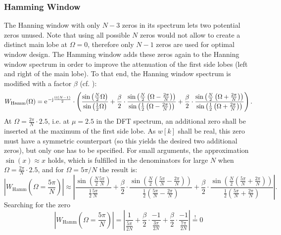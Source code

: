 \documentclass[11pt,a4paper,DIV=12]{scrartcl}
\begin{document}
\subsubsection{Hamming Window}
The Hanning window with only $N-3$ zeros in its spectrum lets two potential
zeros unused.
%
Note that using all possible $N$ zeros would not allow to create a distinct main
lobe at $\Omega=0$, therefore only $N-1$ zeros are used for optimal window
design.
%
The Hamming window adds these zeros again to the Hanning window spectrum in
order to improve the attenuation of the first side lobes (left and right of
the main lobe).
%
To that end, the Hanning window spectrum is modified with a factor $\beta$ (cf.
\cite[Ch. 3.10]{Rabiner1975}):
%
\begin{equation}
W_{\text{Hamm}}(\Omega)=\e^{-\im\frac{\Omega(N-1)}{2}}\cdot\left(\frac{\sin\left(\frac{N}{2}\Omega\right)}{\sin\left(\frac{1}{2}\Omega\right)}+\frac{\beta}{2}\cdot\frac{\sin\left(\frac{N}{2}\left(\Omega-\frac{2\pi}{N}\right)\right)}{\sin\left(\frac{1}{2}\left(\Omega-\frac{2\pi}{N}\right)\right)}+\frac{\beta}{2}\cdot\frac{\sin\left(\frac{N}{2}\left(\Omega+\frac{2\pi}{N}\right)\right)}{\sin\left(\frac{1}{2}\left(\Omega+\frac{2\pi}{N}\right)\right)}\right).
\end{equation}
%
At $\Omega=\frac{2\pi}{N}\cdot2.5$, i.e. at $\mu=2.5$ in the DFT spectrum, an
additional zero shall be inserted at the maximum of the first side lobe.
%
As $w[k]$ shall be real, this zero must have a symmetric counterpart (so this
yields the desired two additional zeros), but only one has to be specified.
%
For small arguments, the approximation $\sin(x)\approx x$ holds, which is
fulfilled in the denominators for large $N$ when $\Omega=\frac{2\pi}{N}\cdot2.5$,
and for $\Omega=5\pi/N$ the result is:
%
\begin{equation}
\left|W_{\text{Hamm}}(\Omega=\frac{5\pi}{N})\right|\approx\left|\frac{\sin\left(\frac{N}{2}\frac{5\pi}{N}\right)}{\frac{1}{2}\frac{5\pi}{N}}+\frac{\beta}{2}\cdot\frac{\sin\left(\frac{N}{2}\left(\frac{5\pi}{N}-\frac{2\pi}{N}\right)\right)}{\frac{1}{2}\left(\frac{5\pi}{N}-\frac{2\pi}{N}\right)}+\frac{\beta}{2}\cdot\frac{\sin\left(\frac{N}{2}\left(\frac{5\pi}{N}+\frac{2\pi}{N}\right)\right)}{\frac{1}{2}\left(\frac{5\pi}{N}+\frac{2\pi}{N}\right)}\right|.
\end{equation}
%
Searching for the zero
%
\begin{equation}
\left|W_{\text{Hamm}}(\Omega=\frac{5\pi}{N})\right|=\left|\frac{1}{\frac{5\pi}{2N}}+\frac{\beta}{2}\cdot\frac{-1}{\frac{3\pi}{2N}}+\frac{\beta}{2}\cdot\frac{-1}{{\frac{7\pi}{2N}}}\right|\stackrel{!}{=}0
\end{equation}
\end{document}
